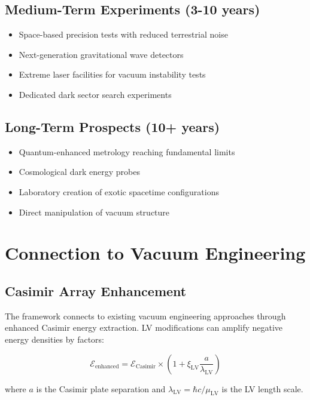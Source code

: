 \documentclass[12pt]{article}
\begin{document}
\subsection{Medium-Term Experiments (3-10 years)}

\begin{itemize}
\item Space-based precision tests with reduced terrestrial noise
\item Next-generation gravitational wave detectors
\item Extreme laser facilities for vacuum instability tests
\item Dedicated dark sector search experiments
\end{itemize}

\subsection{Long-Term Prospects (10+ years)}

\begin{itemize}
\item Quantum-enhanced metrology reaching fundamental limits
\item Cosmological dark energy probes
\item Laboratory creation of exotic spacetime configurations
\item Direct manipulation of vacuum structure
\end{itemize}

\section{Connection to Vacuum Engineering}

\subsection{Casimir Array Enhancement}

The framework connects to existing vacuum engineering approaches through enhanced Casimir energy extraction. LV modifications can amplify negative energy densities by factors:

\begin{equation}
\mathcal{E}_{\text{enhanced}} = \mathcal{E}_{\text{Casimir}} \times \left(1 + \xi_{\text{LV}}\frac{a}{\lambda_{\text{LV}}}\right)
\end{equation}

where $a$ is the Casimir plate separation and $\lambda_{\text{LV}} = \hbar c/\mu_{\text{LV}}$ is the LV length scale.
\end{document}
